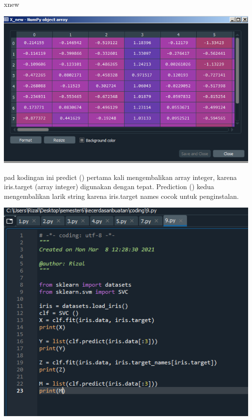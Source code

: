 \documentclass{article}
\begin{document}
xnew
\begin{center}
    \includegraphics[width=.8\textwidth]{figures/1184033/chapter1/18.PNG}
\end{center}

pad kodingan ini predict () pertama kali mengembalikan array integer, karena iris.target (array integer) digunakan dengan tepat. Prediction () kedua mengembalikan larik string karena iris.target names cocok untuk penginstalan.

\begin{center}
    \includegraphics[width=.8\textwidth]{figures/1184033/chapter1/21.PNG}
\end{center}
\end{document}
